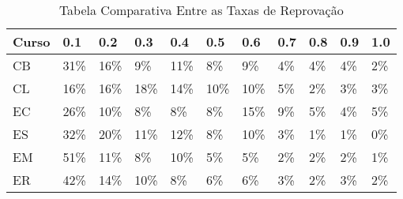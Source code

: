 \begin{table}
\begin{center}
        \begin{tabular}{|p{2cm}| p{1cm}| p{1cm}| p{1cm} | p{1cm} | p{1cm}| p{1cm}
                |p{1cm} | p{1cm} | p{1cm} | p{1cm}|}
        \hline
        \textbf{Curso} & \textbf{0.1} & \textbf{0.2} & \textbf{0.3} & 
        \textbf{0.4} & \textbf{0.5} & \textbf{0.6} & \textbf{0.7} & \textbf{0.8} &
        \textbf{0.9} & \textbf{1.0} \\
        \hline
        \hline
        CB & 31\% & 16\% & 9\% & 11\% & 8\% &
        9\% & 4\% & 4\% & 4\% & 2\% \\
        \hline
        \hline
        CL & 16\% & 16\% & 18\% & 14\% & 10\% &
        10\% & 5\% & 2\% & 3\% & 3\% \\
        \hline
        \hline
        EC & 26\% & 10\% & 8\% & 8\% & 8\% &
        15\% & 9\% & 5\% & 4\% & 5\% \\
        \hline
        \hline
        ES & 32\% & 20\% & 11\% & 12\% & 8\% &
        10\% & 3\% & 1\% & 1\% & 0\% \\
        \hline
        \hline
        EM & 51\% & 11\% & 8\% & 10\% & 5\% &
        5\% & 2\% & 2\% & 2\% & 1\% \\
        \hline
        \hline
        ER & 42\% & 14\% & 10\% & 8\% & 6\% &
        6\% & 3\% & 2\% & 3\% & 2\% \\
        \hline
\end{tabular}
\end{center}
\caption{Tabela Comparativa Entre as Taxas de Reprovação}
\end{table}

